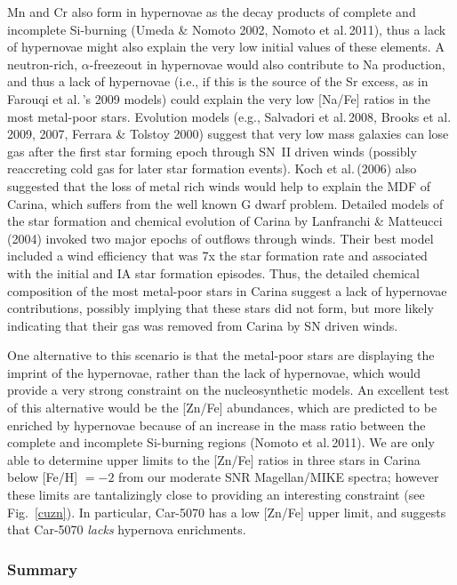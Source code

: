 \documentclass{emulateapj}
\newcommand\etal{{\rm et al.\,}}
\begin{document}
Mn and Cr also form in hypernovae as the decay products of complete 
and incomplete Si-burning (Umeda \& Nomoto 2002, Nomoto \etal 2011), thus 
a lack of hypernovae might also explain the very low initial values of these 
elements.  A neutron-rich, $\alpha$-freezeout in hypernovae would also 
contribute to Na production, and thus a lack of hypernovae (i.e., if this is
the source of the Sr excess, as in Farouqi \etal's 2009 models) 
could explain the very low [Na/Fe] ratios 
in the most metal-poor stars.
%
Evolution models (e.g., Salvadori \etal 2008,
Brooks \etal 2009, 2007, Ferrara \& Tolstoy 2000) 
suggest that very low mass galaxies can lose gas after the first star 
forming epoch through SN~II driven winds (possibly reaccreting cold gas 
for later star formation events). 
Koch \etal (2006) also suggested that the loss of metal rich winds would help 
to explain the MDF of Carina, which suffers from the well known G dwarf 
problem.    Detailed models of the star formation and chemical evolution of
Carina by Lanfranchi \& Matteucci (2004) invoked two major epochs of outflows through
winds.  Their best model included a wind efficiency that was 7x the star formation
rate and associated with the initial and IA star formation episodes.
%
Thus, the detailed chemical composition of the most metal-poor stars 
in Carina suggest a lack of hypernovae contributions, possibly 
implying that these stars did not form, but more likely indicating 
that their gas was removed from Carina by SN driven winds.

One alternative to this scenario is that the metal-poor stars are 
displaying the imprint of the hypernovae, rather than the lack of hypernovae,
which would provide a very strong constraint on the nucleosynthetic models.
An excellent test of this alternative would be the [Zn/Fe] abundances, which
are predicted to be enriched by hypernovae because of an increase in the 
mass ratio between the complete and incomplete Si-burning regions
(Nomoto \etal 2011).  
%
We are only able to determine upper limits to the [Zn/Fe] ratios in three
stars in Carina below [Fe/H] $= -2$ from our moderate SNR Magellan/MIKE spectra; 
however these limits are tantalizingly close to providing an interesting 
constraint (see Fig.~\ref{cuzn}).  
In particular, Car-5070 has a low [Zn/Fe] upper limit, and suggests that 
Car-5070 {\it lacks} hypernova enrichments.   


\subsubsection{Summary}
\end{document}
